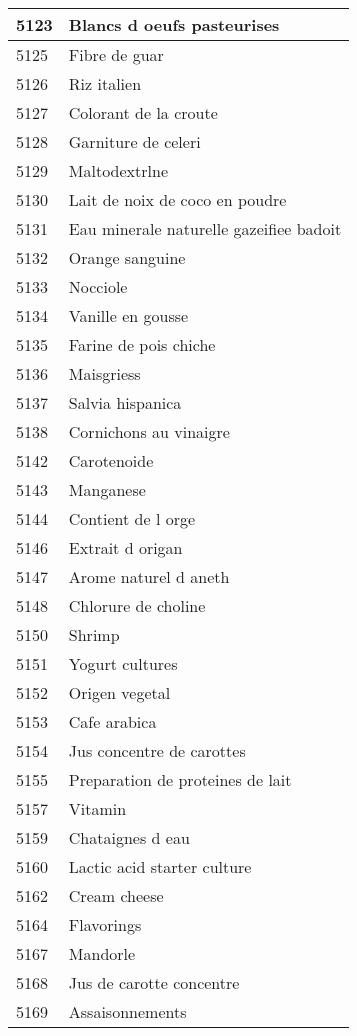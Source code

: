 \begin{longtable}{|l|l|}
5123 & Blancs d oeufs pasteurises \\ \hline 
5125 & Fibre de guar \\ \hline 
5126 & Riz italien \\ \hline 
5127 & Colorant de la croute \\ \hline 
5128 & Garniture de celeri \\ \hline 
5129 & Maltodextrlne \\ \hline 
5130 & Lait de noix de coco en poudre \\ \hline 
5131 & Eau minerale naturelle gazeifiee badoit \\ \hline 
5132 & Orange sanguine \\ \hline 
5133 & Nocciole \\ \hline 
5134 & Vanille en gousse \\ \hline 
5135 & Farine de pois chiche \\ \hline 
5136 & Maisgriess \\ \hline 
5137 & Salvia hispanica \\ \hline 
5138 & Cornichons au vinaigre \\ \hline 
5142 & Carotenoide \\ \hline 
5143 & Manganese \\ \hline 
5144 & Contient de l orge \\ \hline 
5146 & Extrait d origan \\ \hline 
5147 & Arome naturel d aneth \\ \hline 
5148 & Chlorure de choline \\ \hline 
5150 & Shrimp \\ \hline 
5151 & Yogurt cultures \\ \hline 
5152 & Origen vegetal \\ \hline 
5153 & Cafe arabica \\ \hline 
5154 & Jus concentre de carottes \\ \hline 
5155 & Preparation de proteines de lait \\ \hline 
5157 & Vitamin \\ \hline 
5159 & Chataignes d eau \\ \hline 
5160 & Lactic acid starter culture \\ \hline 
5162 & Cream cheese \\ \hline 
5164 & Flavorings \\ \hline 
5167 & Mandorle \\ \hline 
5168 & Jus de carotte concentre \\ \hline 
5169 & Assaisonnements \\ \hline 

\end{longtable}
